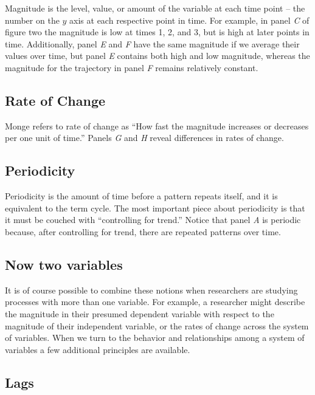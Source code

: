 \documentclass[english,,man]{apa6}
\theoremstyle{definition}
\theoremstyle{definition}
\theoremstyle{definition}
\theoremstyle{remark}
\begin{document}
Magnitude is the level, value, or amount of the variable at each time
point -- the number on the \(y\) axis at each respective point in time.
For example, in panel \emph{C} of figure two the magnitude is low at
times 1, 2, and 3, but is high at later points in time. Additionally,
panel \emph{E} and \emph{F} have the same magnitude if we average their
values over time, but panel \emph{E} contains both high and low
magnitude, whereas the magnitude for the trajectory in panel \emph{F}
remains relatively constant.

\hypertarget{rate-of-change}{%
\subsection{Rate of Change}\label{rate-of-change}}

Monge refers to rate of change as \enquote{How fast the magnitude
increases or decreases per one unit of time.} Panels \emph{G} and
\emph{H} reveal differences in rates of change.

\hypertarget{periodicity}{%
\subsection{Periodicity}\label{periodicity}}

Periodicity is the amount of time before a pattern repeats itself, and
it is equivalent to the term cycle. The most important piece about
periodicity is that it must be couched with \enquote{controlling for
trend.} Notice that panel \emph{A} is periodic because, after
controlling for trend, there are repeated patterns over time.

\hypertarget{now-two-variables}{%
\subsection{Now two variables}\label{now-two-variables}}

It is of course possible to combine these notions when researchers are
studying processes with more than one variable. For example, a
researcher might describe the magnitude in their presumed dependent
variable with respect to the magnitude of their independent variable, or
the rates of change across the system of variables. When we turn to the
behavior and relationships among a system of variables a few additional
principles are available.

\hypertarget{lags}{%
\subsection{Lags}\label{lags}}
\end{document}
